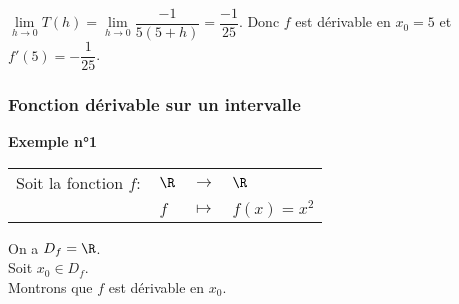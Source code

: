 \vspace*{.5cm}

$\lim\limits_{h \to 0} T(h) = \lim\limits_{h \to 0} \dfrac{-1}{5\left(5+h\right)} = \dfrac{-1}{25}$. Donc $f$ est dérivable en $x_0 = 5$ et $f'(5) = -\dfrac{1}{25}$. 

\vspace*{-5cm}

\newpage

\subsubsection{Fonction dérivable sur un intervalle}

\textbf{Exemple n°1} \\

\begin{tabular}{llll}
\hspace{-.3cm} Soit la fonction $f :$ & $\R$ & $\longrightarrow$ & $\R$ \\
& $f$ & $\longmapsto$ & $f(x) = x^2$ \\
\end{tabular}

On a $D_f = \R$. \\

Soit $x_0 \in D_f$. \\

Montrons que $f$ est dérivable en $x_0$. \\

